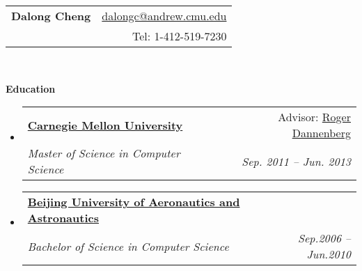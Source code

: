 \documentclass[letterpaper,11pt]{article}
\makeatletter
\newcommand{\resitem}[1]{\item #1 \vspace{-2pt}}
\newcommand{\resheading}[1]{{\large \colorbox{mygrey}{\begin{minipage}{\textwidth}{\textbf{#1 \vphantom{p\^{E}}}}\end{minipage}}}}
\newcommand{\ressubheading}[4]{
\begin{tabular*}{6.5in}{l@{\extracolsep{\fill}}r}
		\textbf{#1} & #2 \\
		\textit{#3} & \textit{#4} \\
\end{tabular*}\vspace{-6pt}}
\makeatother
\begin{document}
\newcommand{\mywebheader}{
\begin{tabular*}{7in}{l@{\extracolsep{\fill}}r}
	\textbf{\LARGE Dalong Cheng} & \href{mailto:dalongc@andrew.cmu.edu}{dalongc@andrew.cmu.edu}\\
	{\footnotesize \texttt{}} & {Tel: 1-412-519-7230} \\
	\end{tabular*}
\\
\vspace{0.1in}}

\mywebheader

\resheading{Education}
	\begin{itemize}
		\item
            \ressubheading{\href{http://www.cmu.edu}{Carnegie Mellon University}}{Advisor: \href{http://www.cs.cmu.edu/~rbd}{Roger Dannenberg}}{{Master of Science in Computer Science}}{Sep. 2011 -- Jun. 2013}
        \item	
            \ressubheading{\href{http://ev.buaa.edu.cn}{Beijing University of Aeronautics and Astronautics}}{}{{Bachelor of Science in Computer Science}}{Sep.2006 -- Jun.2010}
				
\begin{comment}
		\item
			\ressubheading{\href{http://bcc.billings.k12.mt.us/}{Billings Career Center}}{Billings, MT}{\href{http://www.cisco.com/web/learning/netacad/index.html}{Cisco Networking Academy}; GPA:3.33}{Aug. 2002 - May 2003}
				{ \footnotesize
				\begin{itemize}
				\resitem{Graduated \href{http://www.cisco.com/web/learning/netacad/index.html}{Cisco Semester Four} comprising of coursework in networking infrastructures including LAN and WAN design and implementation}
				\end{itemize}
				}
\begin{comment}
		\item
			\ressubheading{\href{http://bcc.billings.k12.mt.us/}{Billings Career Center}}{Billings, MT}{\href{http://www.cisco.com/web/learning/netacad/index.html}{Cisco Networking Academy}; GPA:3.33}{Aug. 2002 - May 2003}
				{ \footnotesize
				\begin{itemize}
				\resitem{Graduated \href{http://www.cisco.com/web/learning/netacad/index.html}{Cisco Semester Four} comprising of coursework in networking infrastructures including LAN and WAN design and implementation}
				\end{itemize}
				}
\end{comment}
	\end{itemize} %
\end{document}

